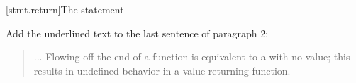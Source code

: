 \setcounter{subsection}{2}
[stmt.return]{The  statement}%
%
%

%

Add the underlined text to the last sentence of paragraph 2:

\begin{quote}
\setcounter{Paras}{1}
  \pnum ... Flowing off the end of a function  is equivalent to a  with no value; this results in
  undefined behavior in a value-returning function.
\end{quote}


%


